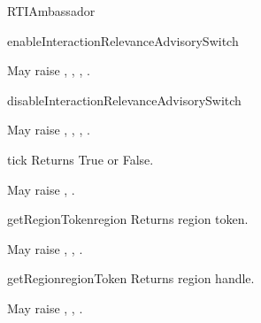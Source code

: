 \begin{classdesc}{RTIAmbassador}{}
\begin{methoddesc}{enableInteractionRelevanceAdvisorySwitch}{}

May raise
,
,
,
.
\end{methoddesc}

\begin{methoddesc}{disableInteractionRelevanceAdvisorySwitch}{}

May raise
,
,
,
.
\end{methoddesc}

\begin{methoddesc}{tick}{}
Returns True or False.

May raise
,
.
\end{methoddesc}

\begin{methoddesc}{getRegionToken}{region}
Returns region token.

May raise
,
,
.
\end{methoddesc}

\begin{methoddesc}{getRegion}{regionToken}
Returns region handle.

May raise
,
,
.
\end{methoddesc}

\end{classdesc}

